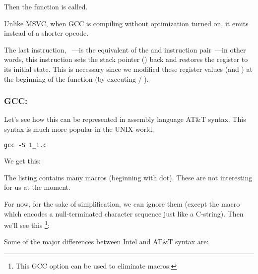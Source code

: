 Then the \printf function is called.

Unlike MSVC, when GCC is compiling without optimization turned on, it emits  instead of a shorter opcode.

The last instruction, \LEAVE~---is the equivalent of the  and  instruction pair~---in other words, this instruction sets the \gls{stack pointer} (\ESP) back and restores the \EBP register to its initial state.
This is necessary since we modified these register values (\ESP and \EBP) at the beginning of the function (by executing  / ).

\subsubsection{GCC: \ATTSyntax}
\label{ATT_syntax}

Let's see how this can be represented in assembly language AT\&T syntax.
This syntax is much more popular in the UNIX-world.

\begin{lstlisting}[caption=let's compile in GCC 4.7.3]
gcc -S 1_1.c
\end{lstlisting}

We get this:



The listing contains many macros (beginning with dot). These are not interesting for us at the moment.

For now, for the sake of simplification, we can ignore them (except the  macro which
encodes a null-terminated character sequence just like a C-string). Then we'll see this
\footnote{This GCC option can be used to eliminate  macros: }:



\myindex{\ATTSyntax}
\myindex{\IntelSyntax}
Some of the major differences between Intel and AT\&T syntax are:

